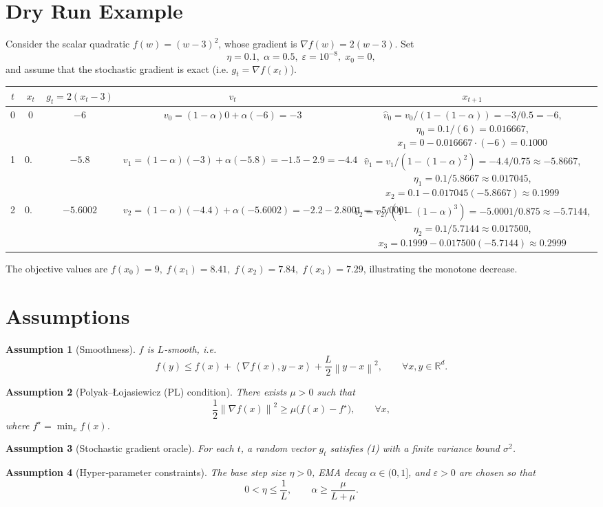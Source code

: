 \documentclass{article}
\newtheorem{assumption}{Assumption}
\newcommand{\norm}[1]{\left\lVert #1\right\rVert}
\newcommand{\inner}[2]{\left\langle #1,#2\right\rangle}
\begin{document}
\section*{Dry Run Example}
Consider the scalar quadratic $f(w)=(w-3)^2$, whose gradient is
$\nabla f(w)=2(w-3)$.  Set
\[
\eta=0.1,\;\alpha=0.5,\;\varepsilon=10^{-8},\;x_0=0,
\]
and assume that the stochastic gradient is exact (i.e. $g_t=\nabla f(x_t)$).

\begin{center}
\begin{tabular}{c|c|c|c|c}
$t$ & $x_t$ & $g_t=2(x_t-3)$ & $v_t$ & $x_{t+1}$ \\ \hline
0 & $0$ & $-6$ & $v_0=(1-\alpha)0+\alpha(-6)=-3$ &
$\hat v_0=v_0/(1-(1-\alpha))=-3/0.5=-6$, 
$\eta_0=0.1/(6)=0.016667$, 
$x_1=0-0.016667\cdot(-6)=0.1000$ \\ \hline
1 & $0.1$ & $-5.8$ &
$v_1=(1-\alpha)(-3)+\alpha(-5.8)=-1.5-2.9=-4.4$ &
$\hat v_1=v_1/(1-(1-\alpha)^2)=-4.4/0.75\approx-5.8667$, 
$\eta_1=0.1/5.8667\approx0.017045$, 
$x_2=0.1-0.017045(-5.8667)\approx0.1999$ \\ \hline
2 & $0.1999$ & $-5.6002$ &
$v_2=(1-\alpha)(-4.4)+\alpha(-5.6002)=-2.2-2.8001=-5.0001$ &
$\hat v_2=v_2/(1-(1-\alpha)^3)=-5.0001/0.875\approx-5.7144$, 
$\eta_2=0.1/5.7144\approx0.017500$, 
$x_3=0.1999-0.017500(-5.7144)\approx0.2999$ \\ 
\end{tabular}
\end{center}
The objective values are $f(x_0)=9,\;f(x_1)=8.41,\;f(x_2)=7.84,\;f(x_3)=7.29$, illustrating the
monotone decrease.

\newpage
\section*{Assumptions}
\begin{assumption}[Smoothness]\label{as:smooth}
$f$ is $L$‑smooth, i.e.
\[
f(y)\le f(x)+\inner{\nabla f(x)}{y-x}+\frac{L}{2}\norm{y-x}^2,
\qquad\forall x,y\in\mathbb{R}^d .
\tag{A1}
\]
\end{assumption}
\begin{assumption}[Polyak–Łojasiewicz (PL) condition]\label{as:pl}
There exists $\mu>0$ such that
\[
\frac{1}{2}\norm{\nabla f(x)}^2\ge \mu\bigl(f(x)-f^\star\bigr),\qquad
\forall x,
\tag{A2}
\]
where $f^\star=\min_x f(x)$.
\end{assumption}
\begin{assumption}[Stochastic gradient oracle]\label{as:stoch}
For each $t$, a random vector $g_t$ satisfies (1) with a finite
variance bound $\sigma^2$.
\end{assumption}
\begin{assumption}[Hyper‑parameter constraints]\label{as:params}
The base step size $\eta>0$, EMA decay $\alpha\in(0,1]$, and
$\varepsilon>0$ are chosen so that
\[
0<\eta\le \frac{1}{L},\qquad
\alpha\ge \frac{\mu}{L+\mu}.
\tag{A4}
\]
\end{assumption}
\end{document}
